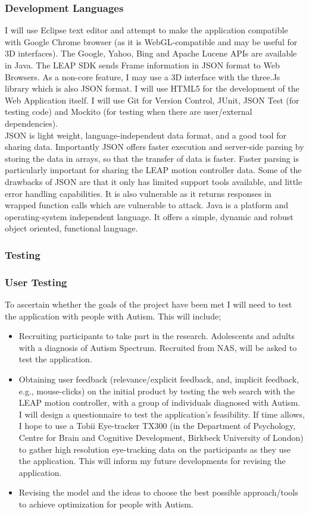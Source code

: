 \documentclass[10pt]{article}
\begin{document}
\subsubsection{Development Languages}
I will use Eclipse text editor and attempt to make the application compatible with Google Chrome browser (as it is WebGL-compatible and may be useful for 3D interfaces). The Google, Yahoo, Bing and Apache Lucene APIs are available in Java. The LEAP SDK sends Frame information in JSON format to Web Browsers. As a non-core feature, I may use a 3D interface with the three.Js library which is also JSON format. I will use HTML5 for the development of the Web Application itself. I will use Git for Version Control, JUnit, JSON Test (for testing code) and Mockito (for testing when there are user/external dependencies). \\
JSON is light weight, language-independent data format, and a good tool for sharing data. Importantly JSON offers faster execution and server-side parsing by storing the data in arrays, so that the transfer of data is faster. Faster parsing is particularly important for sharing the LEAP motion controller data. Some of the drawbacks of JSON are that it only has limited support tools available, and little error handling capabilities. It is also vulnerable as it returns responses in wrapped function calls which are vulnerable to attack. Java is a platform and operating-system independent language. It offers a simple, dynamic and robust object oriented, functional language.

\subsubsection{Testing}
\subsubsection{User Testing}
To ascertain whether the goals of the project have been met I will need to test the application with people with Autism. This will include;
\begin{itemize}
\item Recruiting participants to take part in the research. Adolescents and adults with a diagnosis of Autism Spectrum. Recruited from NAS, will be asked to test the application.
\item Obtaining user feedback (relevance/explicit feedback, and, implicit feedback, e.g., mouse-clicks) on the initial product by testing the web search with the LEAP motion controller, with a group of individuals diagnosed with Autism. I will design a questionnaire to test the application's feasibility. If time allows, I hope to use a Tobii Eye-tracker TX300 (in the Department of Psychology, Centre for Brain and Cognitive Development, Birkbeck University of London) to gather high resolution eye-tracking data on the participants as they use the application. This will inform my future developments for revising the application.
\item Revising the model and the ideas to choose the best possible approach/tools to achieve optimization for people with Autism.
\end{itemize}
\end{document}
